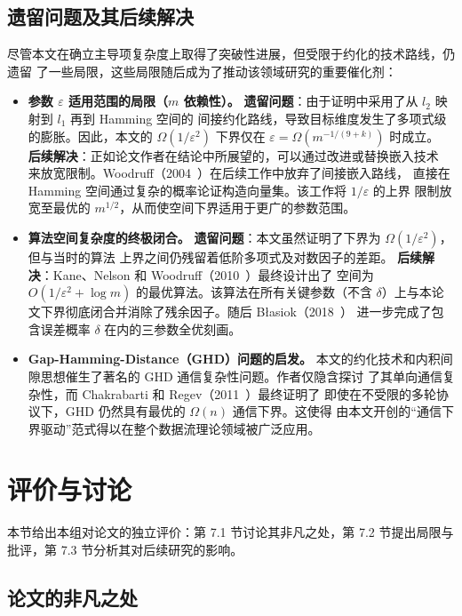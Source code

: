 \documentclass[UTF8, 11pt, a4paper, linestretch=1.15]{ctexart}
\theoremstyle{zhstyle}
\newcommand{\eps}{\varepsilon}
\begin{document}
	\subsection{遗留问题及其后续解决}
	
	尽管本文在确立主导项复杂度上取得了突破性进展，但受限于约化的技术路线，仍遗留
	了一些局限，这些局限随后成为了推动该领域研究的重要催化剂：
	
	\begin{itemize}
		\item \textbf{参数 $\eps$ 适用范围的局限（$m$ 依赖性）。}
		\textbf{遗留问题}：由于证明中采用了从 $l_2$ 映射到 $l_1$ 再到 Hamming 空间的
		间接约化路线，导致目标维度发生了多项式级的膨胀。因此，本文的
		$\Omega(1/\eps^2)$ 下界仅在 $\eps = \Omega(m^{-1/(9+k)})$ 时成立。
		\textbf{后续解决}：正如论文作者在结论中所展望的，可以通过改进或替换嵌入技术
		来放宽限制。Woodruff（2004~\cite{Woo04}）在后续工作中放弃了间接嵌入路线，
		直接在 Hamming 空间通过复杂的概率论证构造向量集。该工作将 $1/\eps$ 的上界
		限制放宽至最优的 $m^{1/2}$，从而使空间下界适用于更广的参数范围。
		\item \textbf{算法空间复杂度的终极闭合。}
		\textbf{遗留问题}：本文虽然证明了下界为 $\Omega(1/\eps^2)$，但与当时的算法
		上界之间仍残留着低阶多项式及对数因子的差距。
		\textbf{后续解决}：Kane、Nelson 和 Woodruff（2010~\cite{KNW10}）最终设计出了
		空间为 $O(1/\eps^2 + \log m)$ 的最优算法。该算法在所有关键参数（不含
		$\delta$）上与本论文下界彻底闭合并消除了残余因子。随后 Błasiok（2018~\cite{Bla18}）
		进一步完成了包含误差概率 $\delta$ 在内的三参数全优刻画。
		\item \textbf{Gap-Hamming-Distance（GHD）问题的启发。}
		本文的约化技术和内积间隙思想催生了著名的 GHD 通信复杂性问题。作者仅隐含探讨
		了其单向通信复杂性，而 Chakrabarti 和 Regev（2011~\cite{CR11}）最终证明了
		即使在不受限的多轮协议下，GHD 仍然具有最优的 $\Omega(n)$ 通信下界。这使得
		由本文开创的“通信下界驱动”范式得以在整个数据流理论领域被广泛应用。
	\end{itemize}
	
	\section{评价与讨论}
	
	本节给出本组对论文的独立评价：第 7.1 节讨论其非凡之处，第 7.2 节提出局限与
	批评，第 7.3 节分析其对后续研究的影响。
	
	\subsection{论文的非凡之处}
	
\end{document}
